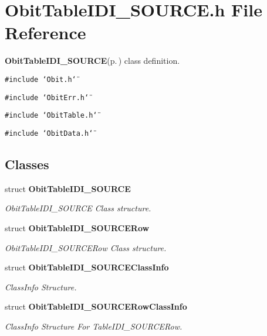 \section{Obit\-Table\-IDI\_\-SOURCE.h File Reference}
\label{ObitTableIDI__SOURCE_8h}
{\bf Obit\-Table\-IDI\_\-SOURCE}{\rm (p.\,\pageref{structObitTableIDI__SOURCE})} class definition. 

{\tt \#include \char`\"{}Obit.h\char`\"{}}\par
{\tt \#include \char`\"{}Obit\-Err.h\char`\"{}}\par
{\tt \#include \char`\"{}Obit\-Table.h\char`\"{}}\par
{\tt \#include \char`\"{}Obit\-Data.h\char`\"{}}\par
\subsection*{Classes}
\begin{CompactItemize}
\item 
struct {\bf Obit\-Table\-IDI\_\-SOURCE}
\begin{CompactList}\small\item\em Obit\-Table\-IDI\_\-SOURCE Class structure. \item\end{CompactList}\item 
struct {\bf Obit\-Table\-IDI\_\-SOURCERow}
\begin{CompactList}\small\item\em Obit\-Table\-IDI\_\-SOURCERow Class structure. \item\end{CompactList}\item 
struct {\bf Obit\-Table\-IDI\_\-SOURCEClass\-Info}
\begin{CompactList}\small\item\em Class\-Info Structure. \item\end{CompactList}\item 
struct {\bf Obit\-Table\-IDI\_\-SOURCERow\-Class\-Info}
\begin{CompactList}\small\item\em Class\-Info Structure For Table\-IDI\_\-SOURCERow. \item\end{CompactList}\end{CompactItemize}
